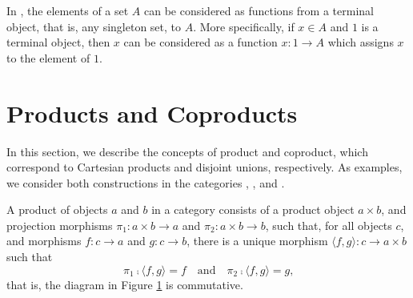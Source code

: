 \begin{example}
  \label{ex:terminal-objects-constants}


  In \set, the elements of a set $A$ can be considered as functions
  from a terminal object, that is, any singleton set, to $A$. More
  specifically, if $x \in A$ and $1$ is a terminal object, then $x$
  can be considered as a function $x: 1 \to A$ which assigns $x$ to
  the element of $1$.

\end{example}

\section{Products and Coproducts}
\label{sec:constructions-products-coproducts}

In this section, we describe the concepts of product and coproduct,
which correspond to Cartesian products and disjoint unions,
respectively. As examples, we consider both constructions in the
categories \set, \hask, and \agda.

\begin{definition}
  \label{def:product}


  A product of objects $a$ and $b$ in a category  consists of a
  product object $a \times b$, and projection morphisms $\pi_{1}: a
  \times b \to a$ and $\pi_{2}: a \times b \to b$, such that, for all
  objects $c$, and morphisms $f: c \to a$ and $g: c \to b$, there is a
  unique morphism $\langle{f,g}\rangle: c \to a \times b$ such that
  \begin{equation}
    \label{eq:product}
    \pi_{1} \comp \langle{f,g}\rangle = f
    \quad
    \text{and}
    \quad
    \pi_{2} \comp \langle{f,g}\rangle = g
    \text{,}
  \end{equation}
  that is, the diagram in Figure \ref{fig:product} is commutative.

  \begin{figure}[htb]
    \begin{center}
    \end{center}
    \caption{}
    \label{fig:product}
  \end{figure}

\end{definition}

